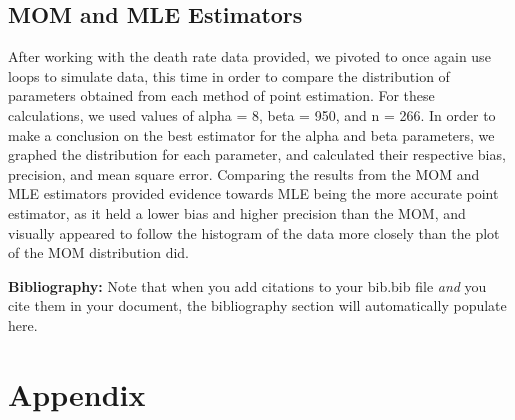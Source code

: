 \documentclass{article}\usepackage[]{graphicx}\usepackage[]{xcolor}
\begin{document}
\begin{multicols}{2}
\subsection{MOM and MLE Estimators}
After working with the death rate data provided, we pivoted to once again use loops to simulate data, this time in order to compare the distribution of parameters obtained from each method of point estimation. For these calculations, we used values of alpha = 8, beta = 950, and n = 266. In order to make a conclusion on the best estimator for the alpha and beta parameters, we graphed the distribution for each parameter, and calculated their respective bias, precision, and mean square error. Comparing the results from the MOM and MLE estimators provided evidence towards MLE being the more accurate point estimator, as it held a lower bias and higher precision than the MOM, and visually appeared to follow the histogram of the data more closely than the plot of the MOM distribution did.

\vspace{2em}

\noindent\textbf{Bibliography:} Note that when you add citations to your bib.bib file \emph{and}
you cite them in your document, the bibliography section will automatically populate here.


\begin{tiny}

\end{tiny}
\end{multicols}

\newpage
\onecolumn
\section{Appendix}
\end{document}
